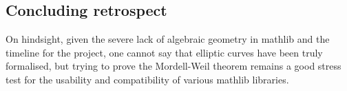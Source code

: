 \subsection{Concluding retrospect}

On hindsight, given the severe lack of algebraic geometry in mathlib and the timeline for the project, one cannot say that elliptic curves have been truly formalised, but trying to prove the Mordell-Weil theorem remains a good stress test for the usability and compatibility of various mathlib libraries.

\pagebreak

\printbibliography

